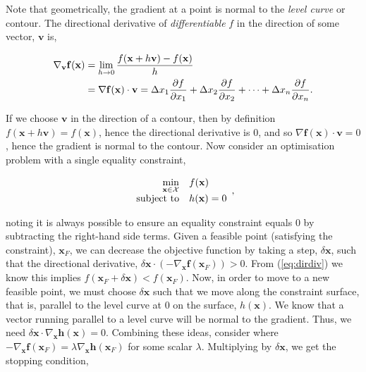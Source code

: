 \documentclass[11pt]{amsart}
\begin{document}
Note that geometrically, the gradient at a point is normal to the \emph{level curve} or contour. The directional derivative of \emph{differentiable} $f$ in the direction of some vector, $\mathbf{v}$ is,

\begin{align}
\nabla_{\mathbf{v}}\mathbf{f}(\mathbf{x}) &= \lim_{h \to 0} \frac{f(\mathbf{x} + h\mathbf{v}) - f(\mathbf{x})}{h} \label{eq:dirdiv} \\
&= \nabla\mathbf{f}(\mathbf{x})\cdot\mathbf{v} = \Delta x_1\frac{\partial f}{\partial x_{1}} + \Delta x_2\frac{\partial f}{\partial x_{2}} + \cdots + \Delta x_n\frac{\partial f}{\partial x_{n}}. \notag
\end{align}

If we choose $\mathbf{v}$ in the direction of a contour, then by definition $f(\mathbf{x} + h\mathbf{v}) = f(\mathbf{x})$, hence the directional derivative is $0$, and so $\nabla\mathbf{f}(\mathbf{x})\cdot\mathbf{v} = 0$, hence the gradient is normal to the contour. Now consider an optimisation problem with a single equality constraint,

\begin{align}
\begin{array}{rl}
\displaystyle \min_{\mathbf{x} \in \mathcal{X}} & f(\mathbf{x})\\
\text{subject to} & h(\mathbf{x}) = 0
\end{array} \notag,
\end{align}

noting it is always possible to ensure an equality constraint equals 0 by subtracting the right-hand side terms. Given a feasible point (satisfying the constraint), $\mathbf{x}_F$, we can decrease the objective function by taking a step, $\delta\mathbf{x}$, such that the directional derivative, $\delta\mathbf{x}\cdot(-\nabla_{\mathbf{x}}\mathbf{f}(\mathbf{x}_F)) > 0$. From (\ref{eq:dirdiv}) we know this implies $f(\mathbf{x}_F + \delta\mathbf{x}) < f(\mathbf{x}_F)$. Now, in order to move to a new feasible point, we must choose $\delta\mathbf{x}$ such that we move along the constraint surface, that is, parallel to the level curve at $0$ on the surface, $h(\mathbf{x})$. We know that a vector running parallel to a level curve will be normal to the gradient. Thus, we need $\delta\mathbf{x}\cdot\nabla_{\mathbf{x}}\mathbf{h}(\mathbf{x}) = 0$. Combining these ideas, consider where $-\nabla_{\mathbf{x}}\mathbf{f}(\mathbf{x}_F) = \lambda\nabla_{\mathbf{x}}\mathbf{h}(\mathbf{x}_F)$ for some scalar $\lambda$. Multiplying by $\delta\mathbf{x}$, we get the stopping condition,
\end{document}
